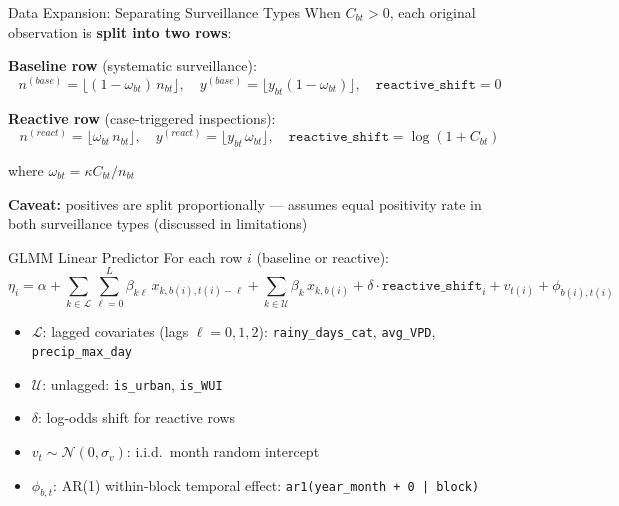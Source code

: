 \documentclass[aspectratio=169]{beamer}
\begin{document}
\begin{frame}{Data Expansion: Separating Surveillance Types}
  When $C_{bt} > 0$, each original observation is \textbf{split into two rows}:

  \vspace{0.3cm}
  \noindent\textbf{Baseline row} (systematic surveillance):
  \begin{equation*}
    n^{(base)} = \lfloor(1-\omega_{bt})\,n_{bt}\rfloor, \quad
    y^{(base)} = \lfloor y_{bt}(1-\omega_{bt})\rfloor, \quad
    \texttt{reactive\_shift} = 0
  \end{equation*}

  \noindent\textbf{Reactive row} (case-triggered inspections):
  \begin{equation*}
    n^{(react)} = \lfloor\omega_{bt}\,n_{bt}\rfloor, \quad
    y^{(react)} = \lfloor y_{bt}\,\omega_{bt}\rfloor, \quad
    \texttt{reactive\_shift} = \log(1+C_{bt})
  \end{equation*}

  where $\omega_{bt} = \kappa C_{bt} / n_{bt}$

  \vspace{0.3cm}
  \textbf{Caveat:} positives are split proportionally --- assumes equal positivity rate in both surveillance types (discussed in limitations)
\end{frame}

\begin{frame}{GLMM Linear Predictor}
  For each row $i$ (baseline or reactive):
  \begin{equation*}
    \eta_i = \alpha
      + \sum_{k \in \mathcal{L}} \sum_{\ell=0}^{L} \beta_{k\ell}\, x_{k,b(i),t(i)-\ell}
      + \sum_{k \in \mathcal{U}} \beta_k\, x_{k,b(i)}
      + \delta \cdot \texttt{reactive\_shift}_i
      + v_{t(i)} + \phi_{b(i),t(i)}
  \end{equation*}

  \begin{itemize}
    \item $\mathcal{L}$: lagged covariates (lags $\ell = 0,1,2$): \texttt{rainy\_days\_cat}, \texttt{avg\_VPD}, \texttt{precip\_max\_day}
    \item $\mathcal{U}$: unlagged: \texttt{is\_urban}, \texttt{is\_WUI}
    \item $\delta$: log-odds shift for reactive rows
    \item $v_t \sim \mathcal{N}(0,\sigma_v)$: i.i.d.\ month random intercept
    \item $\phi_{b,t}$: AR(1) within-block temporal effect: \texttt{ar1(year\_month + 0 | block)}
  \end{itemize}
\end{frame}
\end{document}
